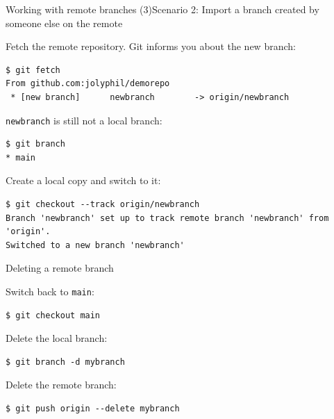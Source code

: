 \documentclass[handout]{beamer}
\begin{document}
\begin{frame}[fragile]{Working with remote branches (3)}{Scenario 2: Import a branch created by someone else on the remote}

Fetch the remote repository. Git informs you about the new branch: 

\begin{lstlisting}
$ git fetch
From github.com:jolyphil/demorepo
 * [new branch]      newbranch        -> origin/newbranch

\end{lstlisting}

\texttt{newbranch} is still not a local branch:

\begin{lstlisting}
$ git branch
* main
\end{lstlisting}

Create a local copy and switch to it: 

\begin{lstlisting}
$ git checkout --track origin/newbranch
Branch 'newbranch' set up to track remote branch 'newbranch' from 'origin'.
Switched to a new branch 'newbranch'
\end{lstlisting}

\end{frame}

\begin{frame}[fragile]{Deleting a remote branch}

Switch back to \texttt{main}:

\begin{lstlisting}
$ git checkout main
\end{lstlisting}

Delete the local branch:

\begin{lstlisting}
$ git branch -d mybranch
\end{lstlisting}

Delete the remote branch:

\begin{lstlisting}
$ git push origin --delete mybranch
\end{lstlisting}

\end{frame}
\end{document}
